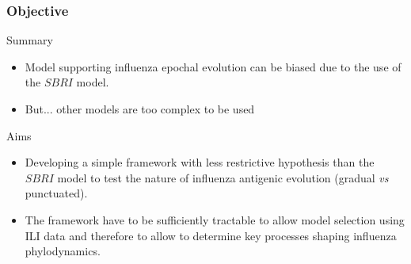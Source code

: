 \documentclass{beamer}
\begin{document}
\begin{frame}
  \frametitle{Objective}
  
  \begin{block}{Summary}
    \begin{itemize}
    \item Model supporting influenza epochal evolution can be biased
      due to the use of the $SBRI$ model.
    \item But... other models are too complex to be used
    \end{itemize}
  \end{block}

  \pause
  \begin{alertblock}{Aims}
    \begin{itemize}
    \item Developing a simple framework with less restrictive
      hypothesis than the $SBRI$ model to test the nature of
      influenza antigenic evolution (gradual \textit{vs} punctuated).
    \item The framework have to be sufficiently tractable to allow
      model selection using ILI data and therefore to allow to determine
      key processes shaping influenza phylodynamics.
    \end{itemize}
  \end{alertblock}

\end{frame}
\end{document}
